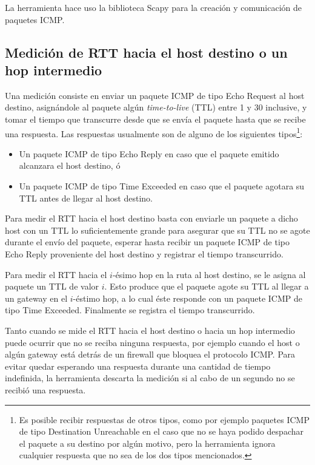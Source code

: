 \documentclass[a4paper, 10pt, twoside]{article}
\begin{document}
La herramienta hace uso la biblioteca Scapy \cite{scapy} para la creación y comunicación de paquetes ICMP.


\subsection{Medición de RTT hacia el host destino o un hop intermedio}

Una medición consiste en enviar un paquete ICMP de tipo Echo Request al host destino, asignándole al paquete algún \emph{time-to-live} (TTL) entre 1 y 30 inclusive, y tomar el tiempo que transcurre desde que se envía el paquete hasta que se recibe una respuesta. Las respuestas usualmente son de alguno de los siguientes tipos\footnote{Es posible recibir respuestas de otros tipos, como por ejemplo paquetes ICMP de tipo Destination Unreachable en el caso que no se haya podido despachar el paquete a su destino por algún motivo, pero la herramienta ignora cualquier respuesta que no sea de los dos tipos mencionados.
}:

\begin{itemize}
  \item Un paquete ICMP de tipo Echo Reply en caso que el paquete emitido alcanzara el host destino, ó
  \item Un paquete ICMP de tipo Time Exceeded en caso que el paquete agotara su TTL antes de llegar al host destino.
\end{itemize}

Para medir el RTT hacia el host destino basta con enviarle un paquete a dicho host con un TTL lo suficientemente grande para asegurar que su TTL no se agote durante el envío del paquete, esperar hasta recibir un paquete ICMP de tipo Echo Reply proveniente del host destino y registrar el tiempo transcurrido.

Para medir el RTT hacia el $i$-ésimo hop en la ruta al host destino, se le asigna al paquete un TTL de valor $i$. Esto produce que el paquete agote su TTL al llegar a un gateway en el $i$-éstimo hop, a lo cual éste responde con un paquete ICMP de tipo Time Exceeded. Finalmente se registra el tiempo transcurrido.

Tanto cuando se mide el RTT hacia el host destino o hacia un hop intermedio puede ocurrir que no se reciba ninguna respuesta, por ejemplo cuando el host o algún gateway está detrás de un firewall que bloquea el protocolo ICMP. Para evitar quedar esperando una respuesta durante una cantidad de tiempo indefinida, la herramienta descarta la medición si al cabo de un segundo no se recibió una respuesta.
\end{document}

